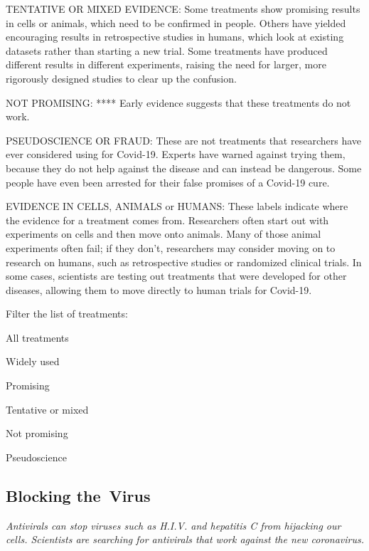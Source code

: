 TENTATIVE OR MIXED EVIDENCE: Some treatments show promising results in
cells or animals, which need to be confirmed in people. Others have
yielded encouraging results in retrospective studies in humans, which
look at existing datasets rather than starting a new trial. Some
treatments have produced different results in different experiments,
raising the need for larger, more rigorously designed studies to clear
up the confusion.

NOT PROMISING: **** Early evidence suggests that these treatments do not
work.

PSEUDOSCIENCE OR FRAUD: These are not treatments that researchers have
ever considered using for Covid-19. Experts have warned against trying
them, because they do not help against the disease and can instead be
dangerous. Some people have even been arrested for their false promises
of a Covid-19 cure.

EVIDENCE IN CELLS, ANIMALS or HUMANS: These labels indicate where the
evidence for a treatment comes from. Researchers often start out with
experiments on cells and then move onto animals. Many of those animal
experiments often fail; if they don't, researchers may consider moving
on to research on humans, such as retrospective studies or randomized
clinical trials. In some cases, scientists are testing out treatments
that were developed for other diseases, allowing them to move directly
to human trials for Covid-19.

Filter the list of treatments:

All treatments

Widely used

Promising

Tentative or mixed

Not promising

Pseudoscience

\hypertarget{blocking-the-virus}{%
\subsection{Blocking the~Virus}\label{blocking-the-virus}}

\emph{Antivirals can stop viruses such as H.I.V. and hepatitis C from
hijacking our cells. Scientists are searching for antivirals that work
against the new coronavirus.}

